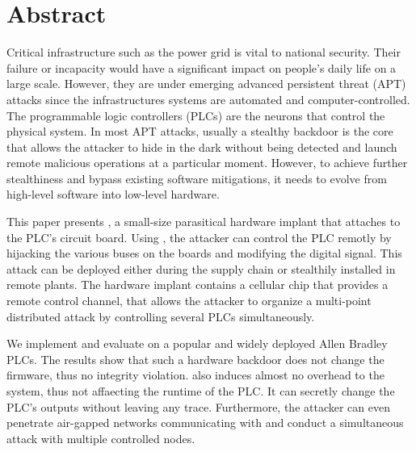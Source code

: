 \section{Abstract}
\label{sec:implant-abstract}


Critical infrastructure such as the power grid is vital to national security.
Their failure or incapacity would have a significant impact on people's daily life on a large scale. However, they are under emerging advanced persistent threat (APT) attacks since the infrastructures systems are automated and computer-controlled. The programmable logic controllers (PLCs) are the neurons that control the physical system. In most APT attacks, usually a stealthy backdoor is the core that allows the attacker to hide in the dark without being detected and launch remote malicious operations at a particular moment. However, to achieve further stealthiness and bypass existing software mitigations, it needs to evolve from high-level software into low-level hardware.

This paper presents \name, a small-size parasitical hardware implant that attaches to the PLC's circuit board. Using \name, the attacker can control the PLC remotly by hijacking the various buses on the boards and modifying the digital signal. This attack can be deployed either during the supply chain or stealthily installed in remote plants. The hardware implant contains a cellular chip that provides a remote control channel, that allows the attacker to organize a multi-point distributed attack by controlling several PLCs simultaneously.

We implement and evaluate \name on a popular and widely deployed Allen Bradley PLCs. The results show that such a hardware backdoor does not change the firmware, thus no integrity violation. \name also induces almost no overhead to the system, thus not affaecting the runtime of the PLC. It can secretly change the PLC's outputs without leaving any trace. Furthermore, the attacker can even penetrate air-gapped networks communicating with \name and conduct a simultaneous attack with multiple controlled nodes.

